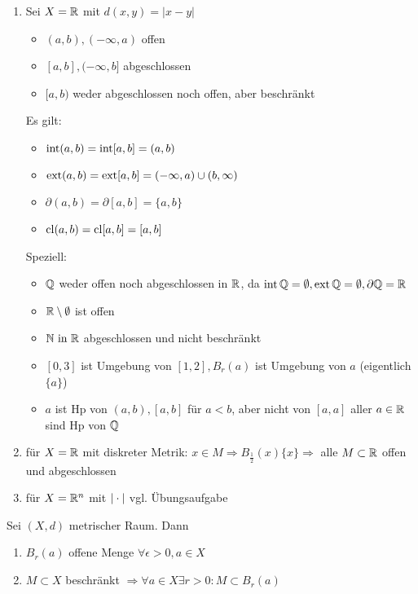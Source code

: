 \begin{exmpn}
    \begin{enumerate}[label={\alph*)}]
        \item Sei $X=\mathbb{R}$ mit $d(x,y)=\vert x-y \vert$
            \begin{itemize}
                \item $(a,b),(-\infty,a)$ offen
                \item $[a,b], (-\infty, b]$ abgeschlossen
                \item $[a,b)$ weder abgeschlossen noch offen, aber beschränkt
            \end{itemize}
        Es gilt:
            \begin{itemize}
                \item $\operatorname{int}(a,b) = \operatorname{int}[a,b] = (a,b)$
                \item $\operatorname{ext}(a,b) = \operatorname{ext}[a,b] = (-\infty,a) \cup (b, \infty)$
                \item $\partial(a,b) = \partial[a,b] = \{a,b\}$
                \item $\operatorname{cl}(a,b) = \operatorname{cl}[a,b]=[a,b]$
            \end{itemize}
        Speziell:
            \begin{itemize}
            \item $\mathbb{Q}$ weder offen noch abgeschlossen in $\mathbb{R}$, da $\operatorname{int} \mathbb{Q} =\emptyset, \operatorname{ext} \mathbb{Q} = \emptyset, \partial \mathbb{Q} = \mathbb{R}$
            \item $\mathbb{R} \setminus \emptyset$ ist offen
            \item $\mathbb{N} \text{ in } \mathbb{R}$ abgeschlossen und nicht beschränkt
            \item $[0,3]$ ist Umgebung von $[1,2], B_r(a)$ ist Umgebung von $a$ (eigentlich $\{a\}$)
            \item $a$ ist Hp von $(a,b),[a,b]$ für $a<b$, aber nicht von $[a,a]$ aller $a\in \mathbb{R}$ sind Hp von $\mathbb{Q}$
            \end{itemize}
        \item für $X=\mathbb{R}$ mit diskreter Metrik: $x\in M \Rightarrow B_{\frac{1}{2}}(x) \{x\} \Rightarrow$ alle $M \subset \mathbb{R}$ offen und abgeschlossen
        \item für $X=\mathbb{R}^n$ mit $\vert \cdot \vert$ vgl. Übungsaufgabe
    \end{enumerate}
\end{exmpn}

\begin{lem}
    Sei $(X,d)$ metrischer Raum. Dann
    \begin{enumerate}[label={\arabic*)}]
    \item $B_r(a)$ offene Menge $\forall \epsilon >0,a\in X$
    \item $M\subset X$ beschränkt $\Rightarrow \forall a \in X \exists r>0\colon M\subset B_r(a)$
    \end{enumerate}
\end{lem}

